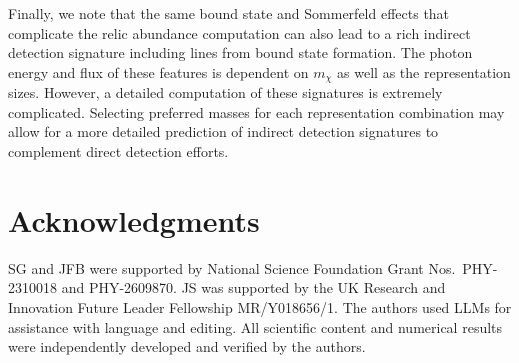 \documentclass[aps,prd,10pt,twocolumn,amsmath,superscriptaddress,amssymb,showpacs,floatfix,bibnotes,longbibliography]{revtex4-2}
\begin{document}
Finally, we note that the same bound state and Sommerfeld effects that complicate the relic abundance computation can also lead to a rich indirect detection signature including lines from bound state formation. The photon energy and flux of these features is dependent on $m_\chi$ as well as the representation sizes. However, a detailed computation of these signatures is extremely complicated. Selecting preferred masses for each representation combination may allow for a more detailed prediction of indirect detection signatures to complement direct detection efforts. 


\section*{Acknowledgments}

SG and JFB were supported by National Science Foundation Grant Nos.\ PHY-2310018 and PHY-2609870. JS was supported by the UK Research and Innovation Future Leader Fellowship MR/Y018656/1. The authors used LLMs for assistance with language and editing. All scientific content and numerical results were independently developed and verified by the authors.


\clearpage
\twocolumngrid

\end{document}
